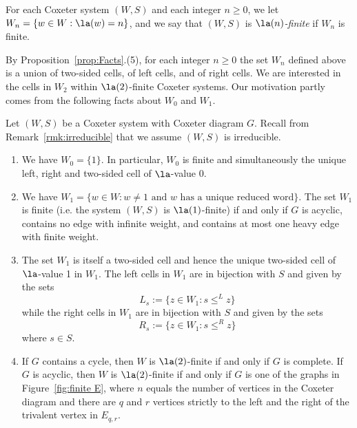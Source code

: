 \begin{definition}
    For each Coxeter system $(W,S)$ and each integer $n\ge 0$, we let $W_n=\{w\in W:\la(w)=n\}$, and we say that
    $(W,S)$ is \emph{$\la(n)$-finite} if $W_n$ is finite. 
    \label{def:an-finite}
\end{definition}
 
By Proposition~\ref{prop:Facts}.(5), for each integer $n\ge 0$ the set $W_n$ defined above is a union of
two-sided cells, of left cells, and of right cells.  We are interested in the cells in $W_2$ within
$\la(2)$-finite Coxeter systems.  Our motivation partly comes from the following facts about $W_0$
and $W_1$. 

\begin{prop}
    \label{prop:facts01}
    Let $(W,S)$ be a Coxeter system with Coxeter diagram $G$. \tul Recall from Remark~\ref{rmk:irreducible} that
    we assume $(W,S)$ is irreducible.\tur
    \begin{enumerate}
        \item We have $W_0=\{1\}$. In particular, $W_0$ is finite and simultaneously
            the unique left, right and two-sided cell of $\la$-value 0. 
        \item We have  $W_1=\{w\in W:w\neq 1 \text{ and $w$ has a unique reduced word}\}$. The
            set $W_1$ is finite \textup{(}i.e. the
                system $(W,S)$
            is $\la(1)$-finite\textup{)} if and only if $G$ is acyclic, contains no edge with infinite
            weight, and contains at most one heavy edge with finite weight.  
        \item The set $W_1$ is itself a two-sided cell and hence the unique two-sided cell of $\la$-value 1 in
            $W_1$. The left cells in $W_1$ are in bijection with $S$ and given by the sets \[ L_{s}:=\{z\in
            W_1:s\le^L z\} \] while the right cells in $W_1$ are in bijection with $S$ and given by the sets \[
            R_{s}:=\{z\in W_1:s\le^R z\} \] where $s\in S$. 
        \item If $G$ contains a cycle, then $W$ is $\la(2)$-finite if and only if $G$ is complete. If~$G$ is
            acyclic, then $W$ is $\la(2)$-finite if and only if $G$ is one of the graphs in Figure~\ref{fig:finite
            E}, where $n$ equals the number of vertices in the Coxeter diagram and there are $q$ and $r$ vertices
            strictly to the left and the right of the trivalent vertex in $E_{q,r}$. 
            \begin{figure}
                \begin{tikzpicture}


\end{tikzpicture}
\end{figure}
\end{enumerate}
\end{prop}

